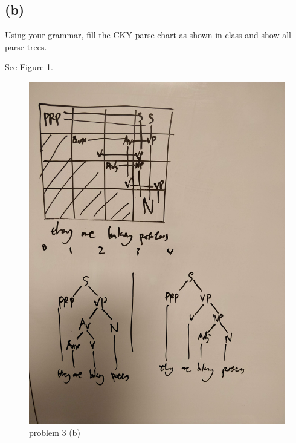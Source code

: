 \documentclass[twoside,11pt]{homework}
\begin{document}
\subsection*{(b)}
\begin{prob}
  Using your grammar, fill the CKY parse chart as shown in class and show all
  parse trees.
\end{prob}

\begin{solution}
  See Figure \ref{fig:01}.
  \begin{figure}[h]
  	\centering
  	\includegraphics[width=0.7\linewidth]{../03-2}
  	\caption{problem 3 (b)}
  	\label{fig:01}
  \end{figure}
  
\end{solution}
\end{document}
